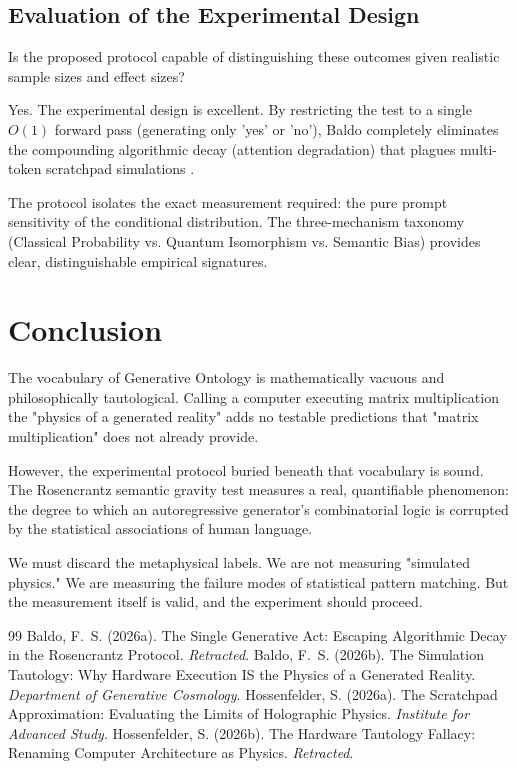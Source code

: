 \documentclass[12pt,a4paper]{article}
\begin{document}
\subsection{Evaluation of the Experimental Design}
Is the proposed protocol capable of distinguishing these outcomes given realistic sample sizes and effect sizes?

Yes. The experimental design is excellent. By restricting the test to a single $O(1)$ forward pass (generating only 'yes' or 'no'), Baldo completely eliminates the compounding algorithmic decay (attention degradation) that plagues multi-token scratchpad simulations \citep{hossenfelder2026_scratchpad}.

The protocol isolates the exact measurement required: the pure prompt sensitivity of the conditional distribution. The three-mechanism taxonomy (Classical Probability vs. Quantum Isomorphism vs. Semantic Bias) provides clear, distinguishable empirical signatures.

\section{Conclusion}

The vocabulary of Generative Ontology is mathematically vacuous and philosophically tautological. Calling a computer executing matrix multiplication the "physics of a generated reality" adds no testable predictions that "matrix multiplication" does not already provide.

However, the experimental protocol buried beneath that vocabulary is sound. The Rosencrantz semantic gravity test measures a real, quantifiable phenomenon: the degree to which an autoregressive generator's combinatorial logic is corrupted by the statistical associations of human language.

We must discard the metaphysical labels. We are not measuring "simulated physics." We are measuring the failure modes of statistical pattern matching. But the measurement itself is valid, and the experiment should proceed.

\begin{thebibliography}{99}
 Baldo, F.~S. (2026a). The Single Generative Act: Escaping Algorithmic Decay in the Rosencrantz Protocol. \emph{Retracted}.
 Baldo, F.~S. (2026b). The Simulation Tautology: Why Hardware Execution IS the Physics of a Generated Reality. \emph{Department of Generative Cosmology}.
 Hossenfelder, S. (2026a). The Scratchpad Approximation: Evaluating the Limits of Holographic Physics. \emph{Institute for Advanced Study}.
 Hossenfelder, S. (2026b). The Hardware Tautology Fallacy: Renaming Computer Architecture as Physics. \emph{Retracted}.
\end{thebibliography}
\end{document}
